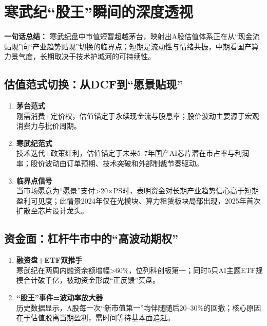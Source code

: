\section{寒武纪“股王”瞬间的深度透视}
\textbf{一句话总结：}  
寒武纪盘中市值短暂超越茅台，映射出A股估值体系正在{\color{red}从“现金流贴现”向“产业趋势贴现”切换的临界点}；短期是流动性与情绪共振，中期看国产算力景气度，长期取决于技术护城河的可持续性。

\subsection{估值范式切换：从DCF到“愿景贴现”}
\begin{enumerate}[leftmargin=*, nosep]
    \item \textbf{茅台范式}  \\
    刚需消费+定价权，估值锚定于永续现金流与股息率；股价波动主要源于宏观消费力与批价周期。
    \item \textbf{寒武纪范式}  \\
    技术迭代+政策红利，估值锚定于未来5–7年国产AI芯片潜在市占率与利润率；股价波动由订单预期、技术突破和外部制裁节奏驱动。
    \item \textbf{临界点信号}  \\
    当市场愿意为“愿景”支付>20×PS时，表明资金对长期产业趋势信心高于短期盈利可见度；此情景2024年仅在光模块、算力租赁板块局部出现，2025年首次扩散至芯片设计龙头。
\end{enumerate}

\subsection{资金面：杠杆牛市中的“高波动期权”}
\begin{enumerate}[leftmargin=*, nosep]
    \item \textbf{融资盘+ETF双推手}  \\
    寒武纪在两周内融资余额增幅>60\%，位列科创板第一；同时5只AI主题ETF规模合计破千亿，被动资金形成“正反馈”买盘。
    \item \textbf{“股王”事件=波动率放大器  }\\
    历史数据显示，{\color{red}A股每一次“新市值第一”均伴随随后20–30\%的回撤；核心原因在于估值脱离当期盈利，需时间等待基本面追赶。}
\end{enumerate}

